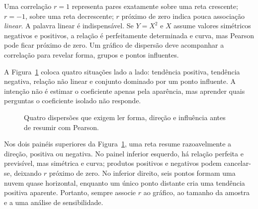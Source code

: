Uma correlação $r=1$ representa pares exatamente sobre uma reta crescente; $r=-1$, sobre uma reta decrescente; $r$ próximo de zero indica pouca associação \textit{linear}. A palavra linear é indispensável. Se $Y=X^2$ e $X$ assume valores simétricos negativos e positivos, a relação é perfeitamente determinada e curva, mas Pearson pode ficar próximo de zero. Um gráfico de dispersão deve acompanhar a correlação para revelar forma, grupos e pontos influentes.

A Figura~\ref{fig:paineis-correlacao} coloca quatro situações lado a lado: tendência positiva, tendência negativa, relação não linear e conjunto dominado por um ponto influente. A intenção não é estimar o coeficiente apenas pela aparência, mas aprender quais perguntas o coeficiente isolado não responde.

\begin{figure}[htbp]
\centering
{}
\caption{Quatro dispersões que exigem ler forma, direção e influência antes de resumir com Pearson.}
\label{fig:paineis-correlacao}
\end{figure}

Nos dois painéis superiores da Figura~\ref{fig:paineis-correlacao}, uma reta resume razoavelmente a direção, positiva ou negativa. No painel inferior esquerdo, há relação perfeita e previsível, mas simétrica e curva; produtos positivos e negativos podem cancelar-se, deixando $r$ próximo de zero. No inferior direito, seis pontos formam uma nuvem quase horizontal, enquanto um único ponto distante cria uma tendência positiva aparente. Portanto, sempre associe $r$ ao gráfico, ao tamanho da amostra e a uma análise de sensibilidade.

